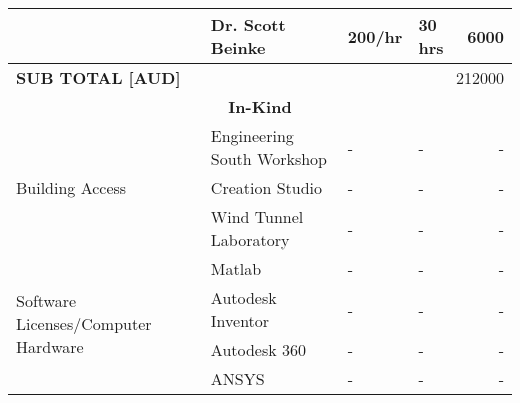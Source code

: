 \begin{table}[h]
{\begin{tabular}{|l|l|l|l|r|}
                                                   & Dr. Scott Beinke                       & 200/hr                               & 30 hrs                        & 6000                                             \\ \hline
\textbf{SUB TOTAL {[}AUD{]}}                       & \multicolumn{4}{r|}{212000}                                                                                                                               \\ \hline
\multicolumn{5}{|c|}{\textbf{In-Kind}}                                                                                                                                                                         \\ \hline

\multirow{3}{*}{Building Access}                   & Engineering South Workshop         & -                                    & -                             & -                                             \\ \cline{2-5} 
                                                   & Creation Studio                    & -                                    & -                             & -                                             \\ \cline{2-5} 
                                                   & Wind Tunnel Laboratory             & -                                    & -                             & -                                             \\ \hline
\multirow{4}{*}{Software Licenses/Computer Hardware} & Matlab                             & -                                    & -                             & -                                             \\ \cline{2-5} 
                                                   & Autodesk Inventor                  & -                                    & -                             & -                                             \\ \cline{2-5} 
                                                   & Autodesk 360                       & -                                    & -                             & -                                             \\ \cline{2-5} 
                                                   & ANSYS                              & -                                    & -                             & -                                             \\ \hline

\end{tabular}}
\end{table}
